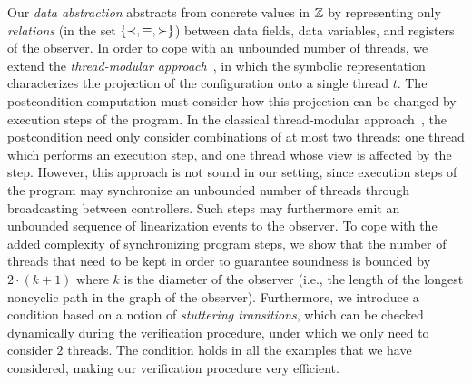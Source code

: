 Our {\em data abstraction} abstracts from concrete values in
${\mathbb Z}$ by representing only
{\em relations}  (in the set $\left\{\prec,\equiv,\succ\right\}$) between data fields,
data variables, and registers of the observer.
In order to cope with an unbounded number of threads,
we extend the {\em thread-modular approach}~\cite{BLMRS:cav08}, in which
the symbolic representation characterizes
the projection of the configuration onto a single thread $t$.
The postcondition computation must consider how this projection can
be changed by execution steps of the program.
In the classical thread-modular approach~\cite{BLMRS:cav08}, the postcondition need
only consider combinations of at most two threads: one thread which performs an execution step, and
one thread whose view is affected by the step.
However, this approach is not sound in our setting, since execution steps of the program may synchronize  an unbounded number of threads through
broadcasting between controllers.
Such steps may furthermore emit an unbounded sequence of
linearization events to the observer.
To cope with the added complexity of synchronizing program steps, we
show that the number of threads that need to be kept in order
to guarantee soundness is bounded by $2\cdot(k+1)$ where
$k$ is the diameter of the observer (i.e., the length
of the longest noncyclic path in the graph of the observer).
%
Furthermore, we introduce a condition based on a notion of {\it stuttering 
transitions}, which can be checked dynamically during the 
verification procedure, under which
we only need to consider $2$ threads.
%
The condition holds in all the examples that we have considered,
making our verification procedure very efficient.

